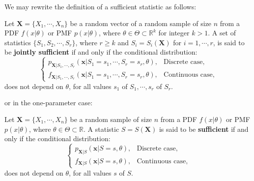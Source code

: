 \documentclass{huhtakm-template-book-v2}
\begin{document}
    We may rewrite the definition of a sufficient statistic as follows:
    \begin{defn}
        Let $\mathbf{X} = \{X_{1}, \cdots, X_{n}\}$ be a random vector of a random sample of size $n$ from a PDF $f(x | \theta)$ or PMF $p(x | \theta)$, where $\theta \in \Theta \subset \mathbb{R}^{k}$ for integer $k > 1$. A set of statistics $\{S_{1}, S_{2}, \cdots, S_{r}\}$, where $r \geq k$ and $S_{i} = S_{i}(\mathbf{X})$ for $i = 1, \cdots, r$, is said to be \textbf{jointly sufficient} if and only if the conditional distribution:
        \begin{equation*}
            \begin{cases}
                p_{\mathbf{X} | S_{1}, \cdots, S_{r}}(\mathbf{x} | S_{1} = s_{1}, \cdots, S_{r} = s_{r}, \theta), &\text{Discrete case},\\
                f_{\mathbf{X} | S_{1}, \cdots, S_{r}}(\mathbf{x} | S_{1} = s_{1}, \cdots, S_{r} = s_{r}, \theta), &\text{Continuous case},
            \end{cases}
        \end{equation*}
        does not depend on $\theta$, for all values $s_{1}$ of $S_{1}, \cdots, s_{r}$ of $S_{r}$.
    \end{defn}
    or in the one-parameter case:
    \begin{defn}
        Let $\mathbf{X} = \{X_{1}, \cdots, X_{n}\}$ be a random sample of size $n$ from a PDF $f(x | \theta)$ or PMF $p(x | \theta)$, where $\theta \in \Theta \subset \mathbb{R}$. A statistic $S = S(\mathbf{X})$ is said to be \textbf{sufficient} if and only if the conditional distribution:
        \begin{equation*}
            \begin{cases}
                p_{\mathbf{X} | S}(\mathbf{x} | S = s, \theta), &\text{Discrete case},\\
                f_{\mathbf{X} | S}(\mathbf{x} | S = s, \theta), &\text{Continuous case},
            \end{cases}
        \end{equation*}
        does not depend on $\theta$, for all values $s$ of $S$.
    \end{defn}
\end{document}
